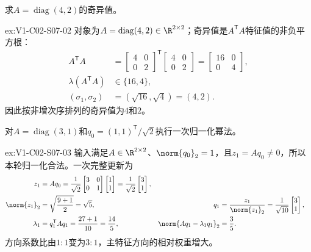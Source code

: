 \begin{SLChapterExercisePairSection}
\begin{exercise}[奇异值]\label{ex:V1-C02-S07-02}
求$A=\operatorname{diag}(4,2)$的奇异值。
\end{exercise}
\label{sol:V1-C02-S07-02}
\begin{chapterexercisesolution}{ex:V1-C02-S07-02}
对象为$A=\operatorname{diag}(4,2)\in\R^{2\times2}$；奇异值是$A^{\mathsf T}A$特征值的非负平方根：
\[
\begin{aligned}
A^{\mathsf T}A
&=\begin{bmatrix}4&0\\0&2\end{bmatrix}^{\mathsf T}
\begin{bmatrix}4&0\\0&2\end{bmatrix}
=\begin{bmatrix}16&0\\0&4\end{bmatrix},\\
\lambda(A^{\mathsf T}A)&\in\{16,4\},\\
(\sigma_1,\sigma_2)&=(\sqrt{16},\sqrt4)=(4,2).
\end{aligned}
\]
因此按非增次序排列的奇异值为$4$和$2$。
\end{chapterexercisesolution}

\begin{exercise}[幂法一步]\label{ex:V1-C02-S07-03}
对$A=\operatorname{diag}(3,1)$和$q_0=(1,1)^{\mathsf T}/\sqrt2$执行一次归一化幂法。
\end{exercise}
\label{sol:V1-C02-S07-03}
\begin{chapterexercisesolution}{ex:V1-C02-S07-03}
输入满足$A\in\R^{2\times2}$、$\norm{q_0}_2=1$，且$z_1=Aq_0\ne0$，所以本轮归一化合法。一次完整更新为
\[
\begin{aligned}
z_1&=Aq_0
=\frac1{\sqrt2}\begin{bmatrix}3&0\\0&1\end{bmatrix}
\begin{bmatrix}1\\1\end{bmatrix}
=\frac1{\sqrt2}\begin{bmatrix}3\\1\end{bmatrix},\\
\norm{z_1}_2&=\sqrt{\frac{9+1}{2}}=\sqrt5,
&q_1&=\frac{z_1}{\norm{z_1}_2}=\frac1{\sqrt{10}}\begin{bmatrix}3\\1\end{bmatrix},\\
\lambda_1&=q_1^{\mathsf T}Aq_1=\frac{27+1}{10}=\frac{14}{5},
&\norm{Aq_1-\lambda_1q_1}_2&=\frac35.
\end{aligned}
\]
方向系数比由$1:1$变为$3:1$，主特征方向的相对权重增大。
\end{chapterexercisesolution}


\end{SLChapterExercisePairSection}
